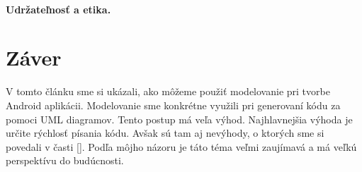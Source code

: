 \documentclass[10pt,twoside,slovak,a4paper]{article}
\begin{document}
 
 \paragraph{Udržateľnosť a etika.}
 
 

\section{Záver} \label{zaver} %
V tomto článku sme si ukázali, ako môžeme použiť modelovanie pri tvorbe Android aplikácii. Modelovanie sme konkrétne využili pri generovaní kódu za pomoci UML diagramov. Tento postup má veľa výhod. Najhlavnejšia výhoda je určite rýchlosť písania kódu. Avšak sú tam aj nevýhody, o ktorých sme si povedali v časti [].\newline
Podľa môjho názoru je táto téma veľmi zaujímavá a má veľkú perspektívu do budúcnosti. 




\newpage

\end{document}
